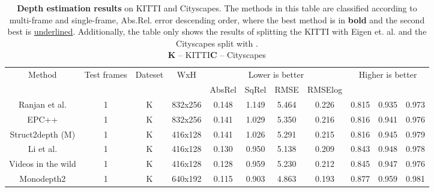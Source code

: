 \documentclass[journal]{IEEEtran}
\begin{document}
\begin{table*}
\caption{\textbf{Depth estimation results} on KITTI and Cityscapes. The methods in this table are classified according to multi-frame and single-frame, Abs.Rel. error descending order, where the best method is in \textbf{bold} and the second best is \underline{underlined}. Additionally, the table only shows the results of splitting the KITTI with Eigen et. al. \cite{eigen2015predicting} and the Cityscapes split with \cite{zhou2017unsupervised}. \\
\textbf{K} – KITTI\quad \textbf{C} – Cityscapes}
\label{tab:1}
\begin{tabular}{ccccccccccc}
\toprule[1pt]
\multirow{2}{*}{Method}                                            & \multirow{2}{*}{Test frames} & \multirow{2}{*}{Dateset} & \multirow{2}{*}{WxH} & \multicolumn{4}{c}{Lower is better} & \multicolumn{3}{c}{Higher is better}                    \\ \cline{5-11} 
                                                                   &                              &                          &                      & AbsRel  & SqRel  & RMSE   & RMSElog &  &  &  \\ \hline
Ranjan et al. \cite{ranjan2019competitive}        & 1                            & K                        & 832x256              & 0.148   & 1.149  & 5.464  & 0.226   & 0.815           & 0.935             & 0.973             \\
EPC++ \cite{luo2019every}                         & 1                            & K                        & 832x256              & 0.141   & 1.029  & 5.350  & 0.216   & 0.816           & 0.941             & 0.976             \\
Struct2depth (M) \cite{casser2019}                & 1                            & K                        & 416x128              & 0.141   & 1.026  & 5.291  & 0.215   & 0.816           & 0.945             & 0.979             \\
Li et al. \cite{li2020unsupervised}               & 1                            & K                        & 416x128              & 0.130   & 0.950  & 5.138  & 0.209   & 0.843           & 0.948             & 0.978             \\
Videos in the wild \cite{gordon2019depth}         & 1                            & K                        & 416x128              & 0.128   & 0.959  & 5.230  & 0.212   & 0.845           & 0.947             & 0.976             \\
Monodepth2 \cite{monodepth2}                      & 1                            & K                        & 640x192              & 0.115   & 0.903  & 4.863  & 0.193   & 0.877           & 0.959             & 0.981             \\

\end{tabular}
\end{table*}
\end{document}
